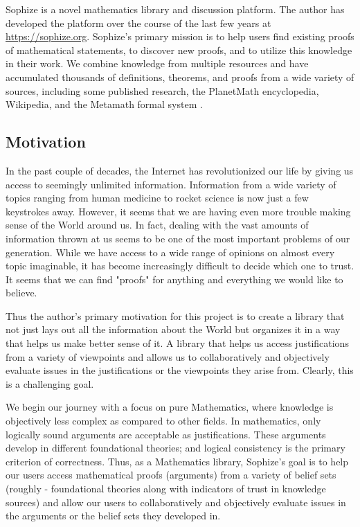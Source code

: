 \documentclass[runningheads]{llncs}
\begin{document}
Sophize is a novel mathematics library and discussion platform. The author has developed the
platform over the course of the last few years at \url{https://sophize.org}. Sophize's
primary mission is to help users find existing proofs of mathematical statements, to
discover new proofs, and to utilize this knowledge in their work. We combine knowledge from
multiple resources and have accumulated thousands of definitions, theorems, and proofs from
a wide variety of sources, including some published research, the PlanetMath encyclopedia,
Wikipedia, and the Metamath formal system \cite{metamath}.

\subsection{Motivation}

In the past couple of decades, the Internet has revolutionized our life by giving us access
to seemingly unlimited information. Information from a wide variety of topics ranging from
human medicine to rocket science is now just a few keystrokes away. However, it seems
that we are having even more trouble making sense of the World around us. In fact, dealing with the vast amounts of information thrown at us seems to be one of the most important problems of our generation. While we have access to a wide range of opinions on almost every topic imaginable, it has become increasingly difficult to decide which one to trust. It
seems that we can find "proofs" for anything and everything we would like to believe.

Thus the author's primary motivation for this project is to create a library that not just
lays out all the information about the World but organizes it in a way that helps us make
better sense of it. A library that helps us access justifications from a variety of
viewpoints and allows us to collaboratively and objectively evaluate issues in the
justifications or the viewpoints they arise from. Clearly, this is a challenging goal. 

We begin our journey with a focus on pure Mathematics, where knowledge is objectively less
complex as compared to other fields. In mathematics, only logically sound arguments are
acceptable as justifications. These arguments develop in different foundational theories;
and logical consistency is the primary criterion of correctness. Thus, as a
Mathematics library, Sophize's goal is to help our users access mathematical proofs (arguments) from a variety of belief sets (roughly - foundational theories along with indicators of trust in knowledge sources) and allow our users to collaboratively and objectively evaluate issues in the arguments or the belief sets they developed in.
\end{document}
